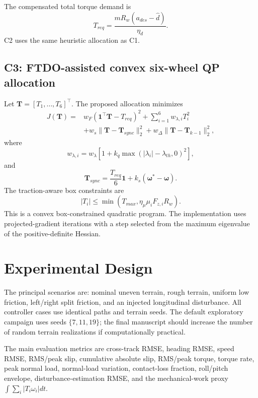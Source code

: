 \documentclass[11pt]{article}
\begin{document}
The compensated total torque demand is
\begin{equation}
T_{req}=\frac{mR_w(a_{des}-\hat d)}{\eta_d}.
\end{equation}
C2 uses the same heuristic allocation as C1.

\subsection{C3: FTDO-assisted convex six-wheel QP allocation}
Let $\bm{T}=[T_1,\ldots,T_6]^\top$. The proposed allocation minimizes
\begin{align}
J(\bm T) = {}& w_F(\bm 1^\top\bm T-T_{req})^2
+\sum_{i=1}^6 w_{\lambda,i}T_i^2 \\
&+w_s\|\bm T-\bm T_{sync}\|_2^2
+w_\Delta\|\bm T-\bm T_{k-1}\|_2^2,
\end{align}
where
\begin{equation}
w_{\lambda,i}=w_\lambda\left[1+k_q\max(|\lambda_i|-\lambda_{th},0)^2\right],
\end{equation}
and
\begin{equation}
\bm T_{sync}=\frac{T_{req}}{6}\bm 1+k_s(\bm\omega^*-\bm\omega).
\end{equation}
The traction-aware box constraints are
\begin{equation}
|T_i|\leq \min\left(T_{max},\eta_\mu\mu_iF_{z,i}R_w\right).
\end{equation}
This is a convex box-constrained quadratic program. The implementation uses projected-gradient iterations with a step selected from the maximum eigenvalue of the positive-definite Hessian.

\section{Experimental Design}
The principal scenarios are: nominal uneven terrain, rough terrain, uniform low friction, left/right split friction, and an injected longitudinal disturbance. All controller cases use identical paths and terrain seeds. The default exploratory campaign uses seeds $\{7,11,19\}$; the final manuscript should increase the number of random terrain realizations if computationally practical.

The main evaluation metrics are cross-track RMSE, heading RMSE, speed RMSE, RMS/peak slip, cumulative absolute slip, RMS/peak torque, torque rate, peak normal load, normal-load variation, contact-loss fraction, roll/pitch envelope, disturbance-estimation RMSE, and the mechanical-work proxy $\int\sum_i|T_i\omega_i|dt$.
\end{document}
